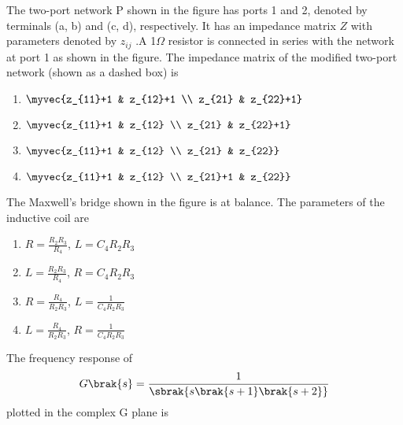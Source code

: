 \item The two-port network P shown in the figure has ports 1 and 2, denoted by
terminals (a, b) and (c, d), respectively. It has an impedance matrix $Z$ with
parameters denoted by $z_{ij}$ .A 1$\Omega$ resistor is connected in series with the network at port 1 as shown in the figure. The impedance matrix of the modified two-port network (shown as a dashed box) is 
\begin{figure}[!ht]
\centering
\resizebox{0.5\textwidth}{!}{%

}%
\end{figure}
 \begin{enumerate}
    \item $\myvec{z_{11}+1 & z_{12}+1 \\ z_{21} & z_{22}+1}$
    \item $\myvec{z_{11}+1 & z_{12} \\ z_{21} & z_{22}+1}$
    \item $\myvec{z_{11}+1 & z_{12} \\ z_{21} & z_{22}}$
    \item $\myvec{z_{11}+1 & z_{12} \\ z_{21}+1 & z_{22}}$ \\
 \end{enumerate}
\item The Maxwell's bridge shown in the figure is at balance. The parameters of the inductive coil are 
\begin{figure}[!ht]
\centering
\resizebox{0.5\textwidth}{!}{%

}%
\end{figure}
\begin{enumerate}
     \item $R = \frac{R_2R_3}{R_4}$, $L = C_4R_2R_3$
     \item $L = \frac{R_2R_3}{R_4}$, $R = C_4R_2R_3$
     \item $R = \frac{R_4}{R_2R_3}$, $L = \frac{1}{C_4R_2R_3}$
     \item $L = \frac{R_4}{R_2R_3}$, $R = \frac{1}{C_4R_2R_3}$ \\
 \end{enumerate}
\item The frequency response of 
\begin{align*}
 G\brak{s} = \frac{1}{\sbrak{s\brak{s+1}\brak{s+2}}}   
\end{align*}
plotted in the complex G plane  is
